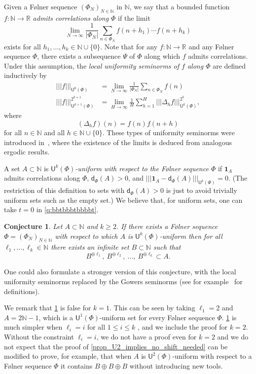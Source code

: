 \documentclass[10pt,dvipsnames]{article}
\newtheorem{conjecture}[theorem]{Conjecture}
\theoremstyle{definition}
\theoremstyle{plain}
\newcommand{\define}[1]{\textit{#1}}
\newcommand{\R}{\mathbb{R}}
\newcommand{\N}{\mathbb{N}}
\newcommand{\dens}{\mathsf{d}}
\newcommand{\Folner}{F\o{}lner}
\newcommand{\one}{\boldsymbol{1}}
\newcommand{\ghk}{|\!|\!|}
\newcommand{\ghkn}[1]{\ghk {#1} \ghk}
\newcommand{\un}[2]{{\mathsf{U}^{#1}(#2)}}
\begin{document}
 
Given a \Folner{} sequence $(\Phi_N)_{N\in\N}$ in $\N$, we say that a bounded function $f\colon \N\to\R$ \define{admits correlations along $\Phi$} if the limit
\[
\lim_{N\to\infty} \frac{1}{|\Phi_N|}\sum_{n\in\Phi_N} f(n+h_1)\cdots f(n+h_k)
\]
exists for all $h_1,\ldots,h_k\in\N\cup\{0\}$.
Note that for any $f\colon \N\to\R$ and any F\o lner sequence $\Phi$, there exists a subsequence $\Psi$ of $\Phi$ along which $f$ admits correlations. 
Under this assumption, the \define{local uniformity seminorms of $f$ along $\Phi$} are defined inductively by
\begin{align*}
\ghkn{f}_\un{0}{\Phi}
&
=
\lim_{N\to\infty} \frac{1}{|\Phi_N|}\sum_{n\in\Phi_N} f(n)
\\
\ghkn{f}_\un{k+1}{\Phi}^{2^{k+1}}
&
=
\lim_{H\to\infty} \frac{1}{H}\sum_{h=1}^H \ghkn{\Delta_h f}_\un{k}{\Phi}^{2^k}, 
\end{align*}
 where
\[
(\Delta_h f)(n)=f(n)f(n+h)
\]
for all $n \in \N$ and all $h \in \N \cup \{0\}$.
These types of uniformity seminorms were introduced in~\cite{HK-uniformity}, where the existence of the limits is deduced from analogous ergodic results.

A set $A\subset\N$ is \define{$\un{k}{\Phi}$-uniform with respect to the  \Folner{} sequence $\Phi$} if $\one_A$ admits correlations along $\Phi$, $\dens_\Phi(A) > 0$,  and $\ghkn{\one_A-\dens_\Phi(A)}_\un{k}{\Phi}=0$. 
(The restriction of this definition to sets with  $\dens_\Phi(A)>0$ is just to avoid trivially uniform sets such as the empty set.) 
We believe that, for uniform sets, one can take $t=0$ in \cref{q:bbtbbbtbbbbt}.  


\begin{conjecture}
\label{conj_uni_shift}
Let $A\subset\N$ and $k\geq2$. 
If there exists a \Folner{} sequence $\Phi=(\Phi_N)_{N\in\N}$ 
with respect to which $A$ is $\un{k}{\Phi}$-uniform
then for all $\ell_1,\ldots,\ell_k\in\N$ there exists an infinite set $B\subset\N$ such that
\[
B^{\oplus \ell_1},~B^{\oplus \ell_2},~\ldots,~B^{\oplus \ell_k}\subset A.
\]
\end{conjecture} 
One could also formulate a stronger version of this conjecture, with the local uniformity seminorms replaced by the Gowers seminorms (see for example~\cite{Green_Tao08} for definitions).


We remark that \cref{conj_uni_shift} is false for $k=1$. This can be seen by taking $\ell_1=2$ and $A=2\N-1$, which is a $\un{1}{\Phi}$-uniform set for every \Folner{} sequence $\Phi$.
\cref{conj_uni_shift} is much simpler when $\ell_i = i$ for all $1 \le i \le k$ , and we include the proof for $k=2$. 
Without the constraint $\ell_i = i$, we do not have a proof even for $k = 2$ and we do not expect that the proof of \cref{prop_U2_implies_no_shift_needed}  can be modified to prove, for example, that when $A$ is $\un{2}{\Phi}$-uniform with respect to a \Folner{} sequence $\Phi$ it contains $B \oplus B \oplus B$ without introducing new tools. 
\end{document}
